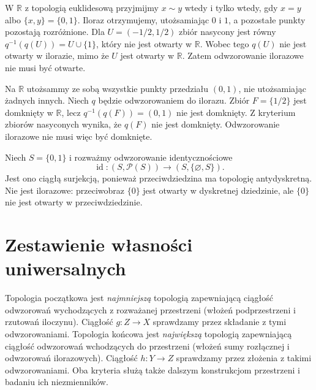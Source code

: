 \begin{przyklad}
\label{ex:topog-iloraz-dwa-punkty}
W $\mathbb R$ z topologią euklidesową przyjmijmy
$x\sim y$ wtedy i tylko wtedy, gdy $x=y$ albo
$\{x,y\}=\{0,1\}$. Iloraz otrzymujemy, utożsamiając
$0$ i $1$, a pozostałe punkty pozostają rozróżnione.
Dla $U=(-1/2,1/2)$ zbiór nasycony jest równy
$q^{-1}(q(U))=U\cup\{1\}$, który nie jest otwarty
w $\mathbb R$. Wobec tego $q(U)$ nie jest otwarty
w ilorazie, mimo że $U$ jest otwarty w $\mathbb R$.
Zatem odwzorowanie ilorazowe nie musi być otwarte.
\end{przyklad}

\begin{przyklad}
\label{ex:topog-iloraz-niedomkniety}
Na $\mathbb R$ utożsammy ze sobą wszystkie punkty
przedziału $(0,1)$, nie utożsamiając żadnych innych.
Niech $q$ będzie odwzorowaniem do ilorazu.
Zbiór $F=\{1/2\}$ jest domknięty w $\mathbb R$,
lecz $q^{-1}(q(F))=(0,1)$ nie jest domknięty.
Z kryterium zbiorów nasyconych wynika, że $q(F)$
nie jest domknięty. Odwzorowanie ilorazowe nie musi
więc być domknięte.
\end{przyklad}

\begin{przyklad}
\label{ex:topog-surjekcja-nieilorazowa}
Niech $S=\{0,1\}$ i rozważmy odwzorowanie
identycznościowe
\[
\operatorname{id}\colon(S,\mathcal P(S))\longrightarrow
       (S,\{\varnothing,S\}).
\]
Jest ono ciągłą surjekcją, ponieważ przeciwdziedzina
ma topologię antydyskretną. Nie jest ilorazowe:
przeciwobraz $\{0\}$ jest otwarty w dyskretnej dziedzinie,
ale $\{0\}$ nie jest otwarty w przeciwdziedzinie.
\end{przyklad}

\section{Zestawienie własności uniwersalnych}
\label{sec:topog-konstrukcje-podsumowanie}

Topologia początkowa jest \emph{najmniejszą} topologią
zapewniającą ciągłość odwzorowań wychodzących
z rozważanej przestrzeni (włożeń podprzestrzeni
i rzutowań iloczynu). Ciągłość $g\colon Z\to X$
sprawdzamy przez składanie z tymi odwzorowaniami.
Topologia końcowa jest \emph{największą} topologią
zapewniającą ciągłość odwzorowań wchodzących
do przestrzeni (włożeń sumy rozłącznej
i odwzorowań ilorazowych).
Ciągłość $h\colon Y\to Z$ sprawdzamy
przez złożenia z takimi odwzorowaniami.
Oba kryteria służą także dalszym konstrukcjom
przestrzeni i badaniu ich niezmienników.
